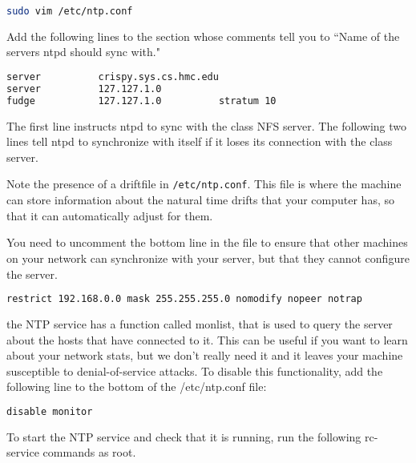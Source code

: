 \documentclass[11pt]{article}
\begin{document}
	\begin{lstlisting}[basicstyle=\ttfamily, backgroundcolor = \color{lightgray}, language = bash, xleftmargin = 0cm, framexleftmargin = 1em]
sudo vim /etc/ntp.conf
\end{lstlisting}

Add the following lines to the section whose comments tell you to ``Name of the servers ntpd should sync with."

\begin{lstlisting}[basicstyle=\ttfamily, backgroundcolor = \color{lightgray}, language = bash, xleftmargin = 0cm, framexleftmargin = 1em]
server          crispy.sys.cs.hmc.edu
server          127.127.1.0
fudge           127.127.1.0          stratum 10
\end{lstlisting}

The first line instructs ntpd to sync with the class NFS server. The following two lines tell ntpd to synchronize with itself if it loses its connection with the class server.

Note the presence of a driftfile in \verb|/etc/ntp.conf|. This file is where the machine can store information about the natural time drifts that your computer has, so that it can automatically adjust for them.

You need to uncomment the bottom line in the file to ensure that other machines on your network can synchronize with your server, but that they cannot configure the server.

\begin{lstlisting}[basicstyle=\ttfamily, backgroundcolor = \color{lightgray}, language = bash, xleftmargin = 0cm, framexleftmargin = 1em]
restrict 192.168.0.0 mask 255.255.255.0 nomodify nopeer notrap
\end{lstlisting}

the NTP service has a function called monlist, that is used to query the server about the hosts that have connected to it. This can be useful if you want to learn about your network stats, but we don't really need it and it leaves your machine susceptible to denial-of-service attacks. To disable this functionality, add the following line to the bottom of the /etc/ntp.conf file:

\begin{lstlisting}[basicstyle=\ttfamily, backgroundcolor = \color{lightgray}, language = bash, xleftmargin = 0cm, framexleftmargin = 1em]
disable monitor
\end{lstlisting} 

To start the NTP service and check that it is running, run the following rc-service commands as root.
\end{document}
